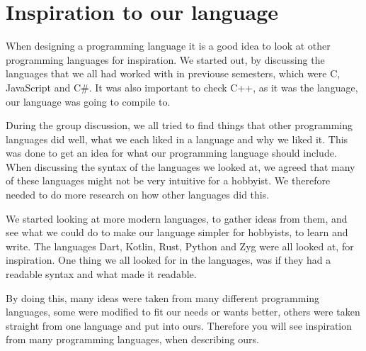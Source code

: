 \section{Inspiration to our language}\label{sec:inspiration}
When designing a programming language it is a good idea to look at other programming languages for inspiration. We started out, by discussing the languages that we all had worked with in previouse semesters, which were C, JavaScript and C\#. It was also important to check C++, as it was the language, our language was going to compile to.

During the group discussion, we all tried to find things that other programming languages did well, what we each liked in a language and why we liked it. This was done to get an idea for what our programming language should include.
When discussing the syntax of the languages we looked at, we agreed that many of these languages might not be very intuitive for a hobbyist. We therefore needed to do more research on how other languages did this.

We started looking at more modern languages, to gather ideas from them, and see what we could do to make our language simpler for hobbyists, to learn and write. The languages Dart, Kotlin, Rust, Python and Zyg were all looked at, for inspiration. One thing we all looked for in the languages, was if they had a readable syntax and what made it readable.

By doing this, many ideas were taken from many different programming languages, some were modified to fit our needs or wants better, others were taken straight from one language and put into ours. Therefore you will see inspiration from many programming languages, when describing ours.




